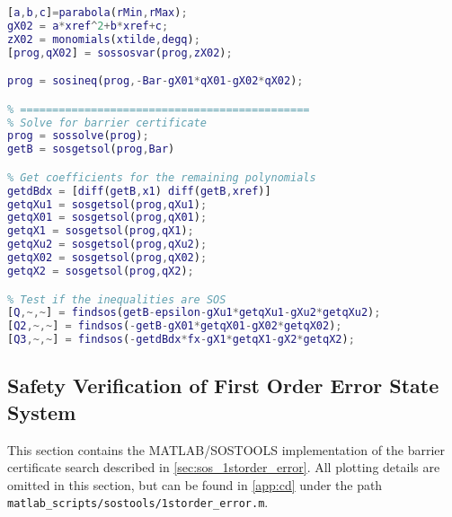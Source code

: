 \begin{lstlisting}[language=matlab]
[a,b,c]=parabola(rMin,rMax);
gX02 = a*xref^2+b*xref+c;
zX02 = monomials(xtilde,degq);
[prog,qX02] = sossosvar(prog,zX02);

prog = sosineq(prog,-Bar-gX01*qX01-gX02*qX02);

% =============================================
% Solve for barrier certificate
prog = sossolve(prog);
getB = sosgetsol(prog,Bar)

% Get coefficients for the remaining polynomials
getdBdx = [diff(getB,x1) diff(getB,xref)]
getqXu1 = sosgetsol(prog,qXu1);
getqX01 = sosgetsol(prog,qX01);
getqX1 = sosgetsol(prog,qX1);
getqXu2 = sosgetsol(prog,qXu2);
getqX02 = sosgetsol(prog,qX02);
getqX2 = sosgetsol(prog,qX2);

% Test if the inequalities are SOS
[Q,~,~] = findsos(getB-epsilon-gXu1*getqXu1-gXu2*getqXu2);
[Q2,~,~] = findsos(-getB-gX01*getqX01-gX02*getqX02);
[Q3,~,~] = findsos(-getdBdx*fx-gX1*getqX1-gX2*getqX2);
\end{lstlisting}

\subsection{Safety Verification of First Order Error State System}\label{app:sos_errorstate_firstorder}
This section contains the MATLAB/SOSTOOLS implementation of the barrier certificate search described in \autoref{sec:sos_1storder_error}. All plotting details are omitted in this section, but can be found in \autoref{app:cd} under the path \texttt{matlab\_scripts/sostools/1storder\_error.m}.

